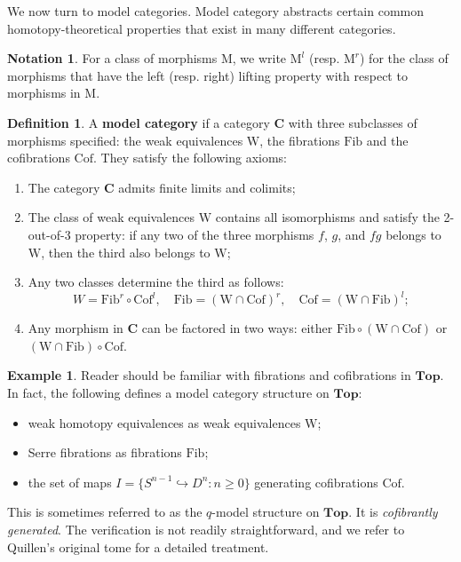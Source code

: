 \documentclass[psamsfonts]{amsart}
\theoremstyle{definition}
\newtheorem{defn}{Definition}[section]
\newtheorem{exmp}{Example}[section]
\newtheorem{notn}{Notation}[section]
\newcommand{\Top}{\mathbf{Top}}
\newcommand{\W}{\mathrm{W}}
\newcommand{\Fib}{\mathrm{Fib}}
\newcommand{\Cof}{\mathrm{Cof}}
\numberwithin{equation}{section}
\begin{document}
We now turn to model categories. Model category abstracts certain common homotopy-theoretical properties that exist in many different categories.

\begin{notn}
For a class of morphisms $\mathrm{M}$, we write $\mathrm{M}^l$ (resp. $\mathrm{M}^r$) for the class of morphisms that have the left (resp. right) lifting property with respect to morphisms in $\mathrm{M}$.
\end{notn}

\begin{defn}
A \textbf{model category} if a category $\mathbf{C}$ with three subclasses of morphisms specified: the weak equivalences $\W$, the fibrations $\Fib$ and the cofibrations $\Cof$. They satisfy the following axioms:\begin{enumerate}[(M1)]
    \item The category $\mathbf{C}$ admits finite limits and colimits;
    \item The class of weak equivalences $\W$ contains all isomorphisms and satisfy the 2-out-of-3 property: if any two of the three morphisms $f$, $g$, and $fg$ belongs to $\W$, then the third also belongs to $\W$;
    \item Any two classes determine the third as follows:
    \[W=\Fib^r\circ\Cof^l,\quad\Fib=(\W\cap\Cof)^r,\quad\Cof=(\W\cap\Fib)^l;\]
    \item Any morphism in $\mathbf{C}$ can be factored in two ways: either $\Fib\circ(\W\cap\Cof)$ or $(\W\cap\Fib)\circ\Cof$.
\end{enumerate}
\end{defn}

\begin{exmp}
Reader should be familiar with fibrations and cofibrations in $\Top$. In fact, the following defines a model category structure on $\Top$:\begin{itemize}
    \item weak homotopy equivalences as weak equivalences $\W$;
    \item Serre fibrations as fibrations $\Fib$;
    \item the set of maps $I=\{S^{n-1}\hookrightarrow D^n:n\geq0\}$ generating cofibrations $\Cof$.
\end{itemize}
This is sometimes referred to as the $q$-model structure on $\Top$. It is \textit{cofibrantly generated}. The verification is not readily straightforward, and we refer to Quillen's original tome \cite{Quillen1} for a detailed treatment.
\end{exmp}
\end{document}
